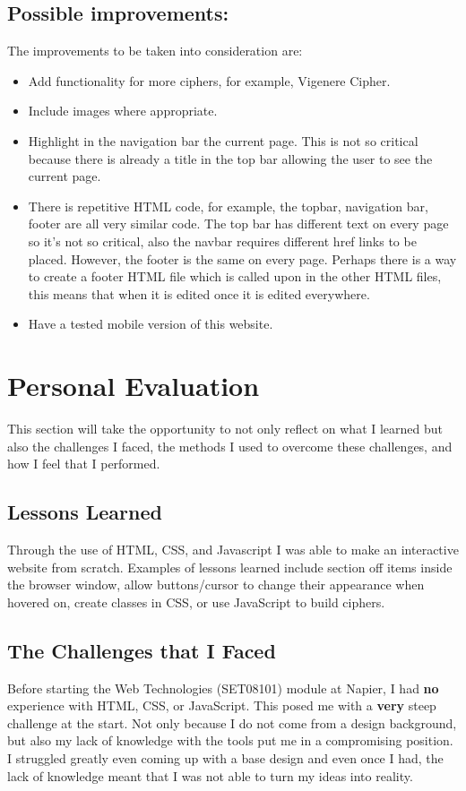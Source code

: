 \documentclass[10pt, a4paper]{article}
\begin{document}
    \subsection{Possible improvements:}The improvements to be taken into consideration are:
    \begin{itemize}
    \item Add functionality for more ciphers, for example, Vigenere Cipher.
    \item Include images where appropriate. 
    \item Highlight in the navigation bar the current page. This is not so critical because there is already a title in the top bar allowing the user to see the current page.
    \item There is repetitive HTML code, for example, the topbar, navigation bar, footer are all very similar code. The top bar has different text on every page so it's not so critical, also the navbar requires different href links to be placed. However, the footer is the same on every page. Perhaps there is a way to create a footer HTML file which is called upon in the other HTML files, this means that when it is edited once it is edited everywhere. 
    \item Have a tested mobile version of this website.
    \end{itemize} 





    \section{Personal Evaluation} 
    This section will take the opportunity to not only reflect on what I learned but also the challenges I faced, the methods I used to overcome these challenges, and how I feel that I performed.
    \subsection{Lessons Learned} Through the use of HTML, CSS, and Javascript I was able to make an interactive website from scratch. Examples of lessons learned include section off items inside the browser window, allow buttons/cursor to change their appearance when hovered on, create classes in CSS, or use JavaScript to build ciphers.

    \subsection{The Challenges that I Faced}
    Before starting the Web Technologies (SET08101) module at Napier, I had \textbf{no} experience with HTML, CSS, or JavaScript. This posed me with a \textbf{very} steep challenge at the start. Not only because I do not come from a design background, but also my lack of knowledge with the tools put me in a compromising position. I struggled greatly even coming up with a base design and even once I had, the lack of knowledge meant that I was not able to turn my ideas into reality. 
\pagebreak
\end{document}
